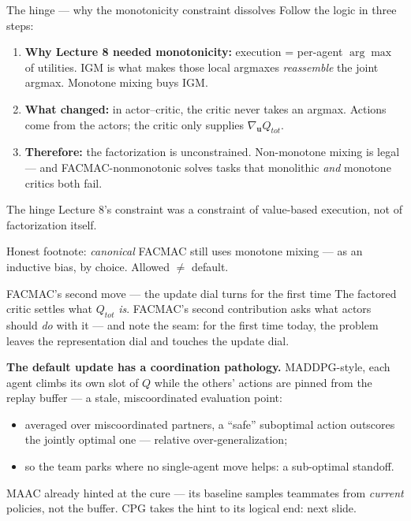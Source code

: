 \documentclass[10pt, aspectratio=169]{beamer}
\begin{document}
\begin{frame}{The hinge --- why the monotonicity constraint dissolves}
Follow the logic in three steps:
\begin{enumerate}\setlength\itemsep{3pt}
\item \textbf{Why Lecture 8 needed monotonicity:} execution = per-agent $\arg\max$ of utilities. IGM is what makes those local argmaxes \emph{reassemble} the joint argmax. Monotone mixing buys IGM.
\item \textbf{What changed:} in actor--critic, \alert{the critic never takes an argmax}. Actions come from the actors; the critic only supplies $\nabla_{\mathbf{u}} Q_{tot}$.
\item \textbf{Therefore:} the factorization is \alert{unconstrained}. Non-monotone mixing is legal --- and FACMAC-nonmonotonic solves tasks that monolithic \emph{and} monotone critics both fail.
\end{enumerate}
\medskip
\pause
\begin{block}{The hinge}
\centering
Lecture 8's constraint was a constraint of \alert{value-based execution}, not of factorization itself.
\end{block}
\smallskip
{\footnotesize\textcolor{mLightBrown}{Honest footnote: \emph{canonical} FACMAC still uses monotone mixing --- as an inductive bias, by choice. Allowed $\neq$ default.}}
\end{frame}

\begin{frame}{FACMAC's second move --- the update dial turns for the first time}
The factored critic settles what $Q_{tot}$ \emph{is}. FACMAC's second contribution asks what actors should \emph{do} with it --- and note the seam: for the first time today, the problem leaves the \alert{representation dial} and touches the \alert{update dial}.
\medskip

\pause
\textbf{The default update has a coordination pathology.} MADDPG-style, each agent climbs its own slot of $Q$ while the others' actions are \alert{pinned from the replay buffer} --- a stale, miscoordinated evaluation point:
\begin{itemize}\setlength\itemsep{2pt}
\item averaged over miscoordinated partners, a ``safe'' suboptimal action outscores the jointly optimal one --- \alert{relative over-generalization};
\item so the team parks where \alert{no single-agent move helps}: a sub-optimal standoff.
\end{itemize}
\smallskip

\pause
{\footnotesize\textcolor{mLightBrown}{MAAC already hinted at the cure --- its baseline samples teammates from \emph{current} policies, not the buffer. CPG takes the hint to its logical end: next slide.}}
\end{frame}
\end{document}
